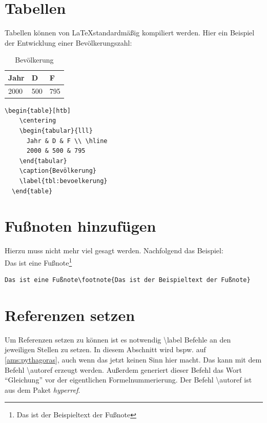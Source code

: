 	\section{Tabellen}
	Tabellen können von \LaTeX standardmäßig kompiliert werden.
	Hier ein Beispiel der Entwicklung einer Bevölkerungszahl:
	\begin{table}[htb]
	    \centering
	    \begin{tabular}{lll}
	      Jahr & D & F \\ \hline
	      2000 & 500 & 795
	    \end{tabular}
	    \caption{Bevölkerung}
	    \label{tbl:bevoelkerung}
  \end{table}
\begin{lstlisting}[style=texlisting, caption={Beispieltabelle Bevölkerungszahl}, label={lst:bevoelkerungszahl}]
  \begin{table}[htb]
    \centering
    \begin{tabular}{lll}
      Jahr & D & F \\ \hline
      2000 & 500 & 795
    \end{tabular}
    \caption{Bevölkerung}
    \label{tbl:bevoelkerung}
  \end{table}
\end{lstlisting}

	\section{Fußnoten hinzufügen}
		\label{sec:fussnoten}
		Hierzu muss nicht mehr viel gesagt werden. Nachfolgend das Beispiel:\\
		Das ist eine Fußnote\footnote{Das ist der Beispieltext der Fußnote}
\begin{lstlisting}[style=texlisting, float=h, caption={Fußnotencode}, label={lst:fussnotencode}]
  Das ist eine Fußnote\footnote{Das ist der Beispieltext der Fußnote}
\end{lstlisting}


	\section{Referenzen setzen}
		\label{sec:refsetzen}
		Um Referenzen setzen zu können ist es notwendig \textbackslash label Befehle an den jeweiligen Stellen zu setzen. In diesem Abschnitt wird bspw. auf  \autoref{ams:pythagoras}, auch wenn das jetzt keinen Sinn hier macht. Das kann mit dem Befehl \textbackslash autoref erzeugt werden. Außerdem generiert dieser Befehl das Wort \enquote{Gleichung} vor der eigentlichen Formelnummerierung. Der Befehl \textbackslash autoref ist aus dem Paket \emph{hyperref}.
	
